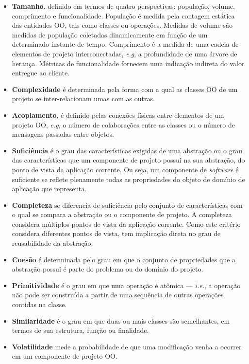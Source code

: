 \begin{itemize}
	\item \textbf{Tamanho}, definido em termos de quatro perspectivas: população, volume, comprimento e funcionalidade. População é medida pela contagem estática das entidades OO, tais como classes ou operações. Medidas de volume são medidas de população coletadas dinamicamente em função de um determinado instante de tempo. Comprimento é a medida de uma cadeia de elementos de projeto interconectadas, \textit{e.g}, a profundidade de uma árvore de herança. Métricas de funcionalidade fornecem uma indicação indireta do valor entregue ao cliente.
	\item \textbf{Complexidade} é determinada pela forma com a qual as classes OO de um projeto se inter-relacionam umas com as outras.
	\item \textbf{Acoplamento}, é definido pelas conexões físicas entre elementos de um projeto OO, \textit{e.g}, o número de colaborações entre as classes ou o número de mensagens passadas entre objetos.
	\item \textbf{Suficiência} é o grau das características exigidas de uma abstração ou o grau das características que um componente de projeto possui na sua abstração, do ponto de vista da aplicação corrente. Ou seja, um componente de \textit{software} é suficiente se reflete plenamente todas as propriedades do objeto de domínio de aplicação que representa.
	\item \textbf{Completeza} se diferencia de suficiência pelo conjunto de características com o qual se compara a abstração ou o componente de projeto. A completeza considera múltiplos pontos de vista da aplicação corrente. Como este critério considera diferentes pontos de vista, tem implicação direta no grau de reusabilidade da abstração.
	\item \textbf{Coesão} é determinada pelo grau em que o conjunto de propriedades que a abstração possui é parte do problema ou do domínio do projeto.
	\item \textbf{Primitividade} é o grau em que uma operação é atômica --- \textit{i.e.}, a operação não pode ser construída a partir de uma sequência de outras operações contidas na classe.
	\item \textbf{Similaridade} é o grau em que duas ou mais classes são semelhantes, em termos de sua estrutura, função ou finalidade.
	\item \textbf{Volatilidade} mede a probabilidade de que uma modificação venha a ocorrer em um componente de projeto OO.
\end{itemize}


